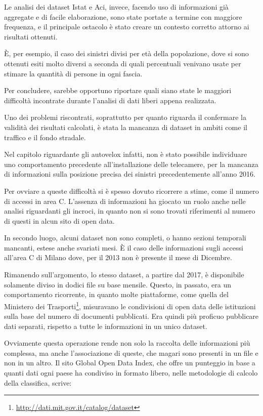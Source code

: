 \documentclass[a4paper,12pt]{report}
\newcommand{\skipline}{\vspace{0.2in}}
\begin{document}
Le analisi dei dataset Istat e Aci, invece, facendo uso di informazioni già aggregate 
e di facile elaborazione, sono state portate a termine con maggiore frequenza, e il 
principale ostacolo è stato creare un contesto corretto attorno ai risultati ottenuti. 

\`E, per esempio, il caso dei sinistri divisi per età della popolazione, 
dove si sono ottenuti esiti 
molto diversi a seconda di quali percentuali venivano usate per stimare la quantità di 
persone in ogni fascia. 

\skipline
Per concludere, sarebbe opportuno riportare quali siano state le maggiori difficoltà 
incontrate durante l'analisi di dati liberi appena realizzata. 

Uno dei problemi riscontrati, soprattutto per quanto riguarda il confermare la 
validità dei risultati calcolati, è stata la mancanza di dataset in ambiti come 
il traffico e il fondo stradale. 

Nel capitolo riguardante gli autovelox infatti, non è stato possibile individuare 
uno comportamento precedente all'installazione delle telecamere, 
per la mancanza di informazioni 
sulla posizione precisa dei sinistri precedentemente all'anno 2016. 

Per ovviare a queste difficoltà si è spesso dovuto ricorrere a stime, 
come il numero di accessi in area C. 
L'assenza di informazioni ha giocato un ruolo anche nelle analisi riguardanti gli incroci, 
in quanto non si sono trovati riferimenti al numero di questi in alcun sito di open data. 


In secondo luogo, alcuni dataset non sono completi, o hanno sezioni temporali mancanti,
estese anche svariati mesi. 
\`E il caso delle informazioni sugli accessi all'area C di Milano dove, 
per il 2013 non è presente il mese di Dicembre. 

Rimanendo sull'argomento, lo stesso dataset, a partire dal 2017, è disponibile 
solamente diviso in dodici file su base mensile. 
Questo, in passato, era un comportamento ricorrente, in 
quanto molte piattaforme, come quella del Ministero dei 
Trasporti\footnote{\url{http://dati.mit.gov.it/catalog/dataset}}, 
misuravano le condivisioni di open data delle istituzioni 
sulla base del numero di documenti pubblicati. 
Era quindi più proficuo pubblicare dati separati, rispetto a tutte le informazioni in 
un unico dataset. 

Ovviamente questa operazione rende non solo la raccolta delle informazioni più complessa, 
ma anche l'associazione di queste, che magari sono presenti in un file e non in un altro. 
Il sito Global Open Data Index, che offre un punteggio in base a quanti dati ogni paese 
ha condiviso in formato libero, nelle metodologie di calcolo della classifica, scrive: 
\end{document}

